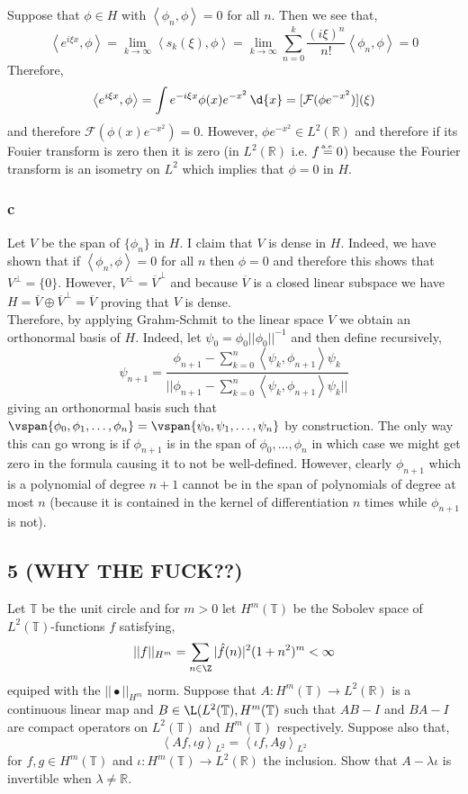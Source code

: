 \documentclass[12pt]{article}
\newcommand{\inner}[2]{\left< #1, #2 \right>}
\newcommand{\R}{\mathbb{R}}
\renewcommand{\T}{\mathbb{T}}
\newcommand\eqae{\mathrel{\stackrel{\makebox[0pt]{\mbox{\normalfont\tiny a.e.}}}{=}}}
\renewcommand{\F}{\mathcal{F}}
\begin{document}
Suppose that $\phi \in H$ with $\inner{\phi_n}{\phi} = 0$ for all $n$. Then we see that,
\[ \inner{e^{i \xi x}}{\phi} = \lim_{k \to \infty} \inner{s_k(\xi)}{\phi} = \lim_{k \to \infty} \sum_{n = 0}^k \frac{(i \xi)^n}{n!} \inner{\phi_n}{\phi} = 0 \]
Therefore,
\[ \inner{e^{i \xi x}}{\phi} = \int e^{-i \xi x} \phi(x) e^{-x^2} \, \d{x} = [\F (\phi e^{-x^2})](\xi) \]
and therefore $\F (\phi(x) e^{-x^2}) = 0$. However, $\phi  e^{-x^2} \in L^2(\R)$ and therefore if its Fouier transform is zero then it is zero (in $L^2(\R)$ i.e. $f \eqae 0$) because the Fourier transform is an isometry on $L^2$ which implies that $\phi = 0$ in $H$.

\subsubsection{c}

Let $V$ be the span of $\{ \phi_n \}$ in $H$. I claim that $V$ is dense in $H$. Indeed, we have shown that if $\inner{\phi_n}{\phi} = 0$ for all $n$ then $\phi = 0$ and therefore this shows that $V^\perp = \{ 0 \}$. However, $V^\perp = \overline{V}^\perp$ and because $\overline{V}$ is a closed linear subspace we have $H = \overline{V} \oplus \overline{V}^\perp = \overline{V}$ proving that $V$ is dense.
\bigskip\\
Therefore, by applying Grahm-Schmit to the linear space $V$ we obtain an orthonormal basis of $H$. Indeed, let $\psi_0 = \phi_0 || \phi_0 ||^{-1}$ and then define recursively,
\[ \psi_{n+1} = \frac{\phi_{n+1} - \sum\limits_{k = 0}^n \inner{\psi_k}{\phi_{n+1}} \psi_k}{|| \phi_{n+1} - \sum\limits_{k = 0}^n \inner{\psi_k}{\phi_{n+1}} \psi_k ||} \]
giving an orthonormal basis such that $\vspan{\phi_0, \phi_1, \dots, \phi_n} = \vspan{ \psi_0, \psi_1, \dots, \psi_n}$ by construction. The only way this can go wrong is if $\phi_{n+1}$ is in the span of $\phi_0, \dots, \phi_n$ in which case we might get zero in the formula causing it to not be well-defined. However, clearly $\phi_{n+1}$ which is a polynomial of degree $n+1$ cannot be in the span of polynomials of degree at most $n$ (because it is contained in the kernel of differentiation $n$ times while $\phi_{n+1}$ is not). 


\subsection{5 (WHY THE FUCK??)}

\begin{exercise}
Let $\T$ be the unit circle and for $m > 0$ let $H^m(\T)$ be the Sobolev space of $L^2(\T)$-functions $f$ satisfying,
\[ || f ||_{H^m} = \sum_{n \in \Z} | \hat{f}(n) |^2 ( 1 + n^2)^m < \infty \]
equiped with the $|| \bullet ||_{H^m}$ norm. Suppose that $A : H^m(\T) \to L^2(\R)$ is a continuous linear map and $B \in \L(L^2(\T), H^m(\T)$ such that $AB - I$ and $BA -  I$ are compact operators on $L^2(\T)$ and $H^m(\T)$ respectively. Suppose also that,
\[ \inner{A f}{\iota g}_{L^2} = \inner{\iota f}{Ag}_{L^2} \]
for $f, g \in H^m(\T)$ and $\iota : H^m(\T) \to L^2(\R)$ the inclusion. Show that $A - \lambda \iota$ is invertible when $\lambda \neq \R$.
\end{exercise}
\end{document}
